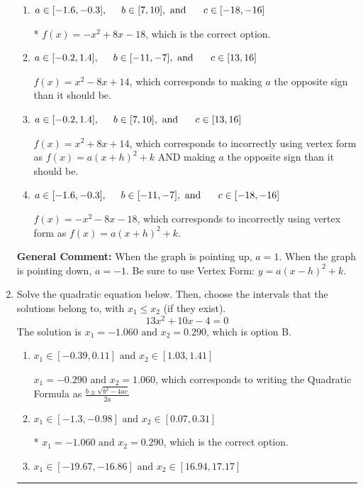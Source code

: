 \documentclass{extbook}[14pt]
\newcommand{\litem}[1]{\item #1

\rule{\textwidth}{0.4pt}}
\begin{document}
\begin{enumerate}
{\begin{enumerate}[label=\Alph*.]
$f(x)=-x^{2} -8 x -14$, which corresponds to incorrectly using vertex form as $f(x) = a(x+h)^2 - k$.
\item \( a \in [-1.6, -0.3], \hspace*{5mm} b \in [7, 10], \text{ and } \hspace*{5mm} c \in [-18, -16] \)

* $f(x)=-x^{2} +8 x -18$, which is the correct option.
\item \( a \in [-0.2, 1.4], \hspace*{5mm} b \in [-11, -7], \text{ and } \hspace*{5mm} c \in [13, 16] \)

$f(x)=x^{2} -8 x + 14$, which corresponds to making $a$ the opposite sign than it should be.
\item \( a \in [-0.2, 1.4], \hspace*{5mm} b \in [7, 10], \text{ and } \hspace*{5mm} c \in [13, 16] \)

$f(x)=x^{2} +8 x + 14$, which corresponds to incorrectly using vertex form as $f(x) = a(x+h)^2+k$ AND making $a$ the opposite sign than it should be.
\item \( a \in [-1.6, -0.3], \hspace*{5mm} b \in [-11, -7], \text{ and } \hspace*{5mm} c \in [-18, -16] \)

$f(x)=-x^{2} -8 x -18$, which corresponds to incorrectly using vertex form as $f(x) = a(x+h)^2+k$.
\end{enumerate}

\textbf{General Comment:} When the graph is pointing up, $a=1$. When the graph is pointing down, $a=-1$. Be sure to use Vertex Form: $y = a(x-h)^2+k$.
}
\litem{
Solve the quadratic equation below. Then, choose the intervals that the solutions belong to, with $x_1 \leq x_2$ (if they exist).
\[ 13x^{2} +10 x -4 = 0 \]The solution is \( x_1 = -1.060 \text{ and } x_2 = 0.290 \), which is option B.\begin{enumerate}[label=\Alph*.]
\item \( x_1 \in [-0.39, 0.11] \text{ and } x_2 \in [1.03, 1.41] \)

 $x_1 = -0.290 \text{ and } x_2 = 1.060$, which corresponds to writing the Quadratic Formula as $\frac{b \pm \sqrt{b^2 - 4ac}}{2a}$
\item \( x_1 \in [-1.3, -0.98] \text{ and } x_2 \in [0.07, 0.31] \)

* $x_1 = -1.060 \text{ and } x_2 = 0.290$, which is the correct option.
\item \( x_1 \in [-19.67, -16.86] \text{ and } x_2 \in [16.94, 17.17] \)


\end{enumerate}}
\end{enumerate}
\end{document}

